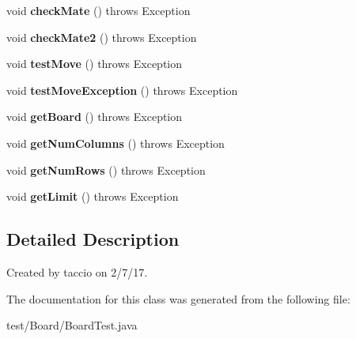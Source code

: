 \begin{DoxyCompactItemize}
\item 
\hypertarget{classBoard_1_1BoardTest_ace6072d8d0e7144454113e62b9ba6703}{void {\bfseries check\-Mate} ()  throws Exception }\label{classBoard_1_1BoardTest_ace6072d8d0e7144454113e62b9ba6703}

\item 
\hypertarget{classBoard_1_1BoardTest_a6cca33a12e7caf99a18cd4f3846037c9}{void {\bfseries check\-Mate2} ()  throws Exception }\label{classBoard_1_1BoardTest_a6cca33a12e7caf99a18cd4f3846037c9}

\item 
\hypertarget{classBoard_1_1BoardTest_a4e1243b5604936e1c651f851850644fd}{void {\bfseries test\-Move} ()  throws Exception }\label{classBoard_1_1BoardTest_a4e1243b5604936e1c651f851850644fd}

\item 
\hypertarget{classBoard_1_1BoardTest_ad323c55fdd4ced38a9feb3c33905022c}{void {\bfseries test\-Move\-Exception} ()  throws Exception}\label{classBoard_1_1BoardTest_ad323c55fdd4ced38a9feb3c33905022c}

\item 
\hypertarget{classBoard_1_1BoardTest_a4353e2b96f89dc3ddd8cf1a0967f2b73}{void {\bfseries get\-Board} ()  throws Exception }\label{classBoard_1_1BoardTest_a4353e2b96f89dc3ddd8cf1a0967f2b73}

\item 
\hypertarget{classBoard_1_1BoardTest_a16e4087fb6a6d9d9e94f548c51c29aec}{void {\bfseries get\-Num\-Columns} ()  throws Exception }\label{classBoard_1_1BoardTest_a16e4087fb6a6d9d9e94f548c51c29aec}

\item 
\hypertarget{classBoard_1_1BoardTest_ab3b68e75b17a6392366cee7d3e8c25cf}{void {\bfseries get\-Num\-Rows} ()  throws Exception }\label{classBoard_1_1BoardTest_ab3b68e75b17a6392366cee7d3e8c25cf}

\item 
\hypertarget{classBoard_1_1BoardTest_a442991de8ee38de866f914259adbfed9}{void {\bfseries get\-Limit} ()  throws Exception }\label{classBoard_1_1BoardTest_a442991de8ee38de866f914259adbfed9}

\end{DoxyCompactItemize}


\subsection{Detailed Description}
Created by taccio on 2/7/17. 

The documentation for this class was generated from the following file\-:\begin{DoxyCompactItemize}
\item 
test/\-Board/Board\-Test.\-java\end{DoxyCompactItemize}
